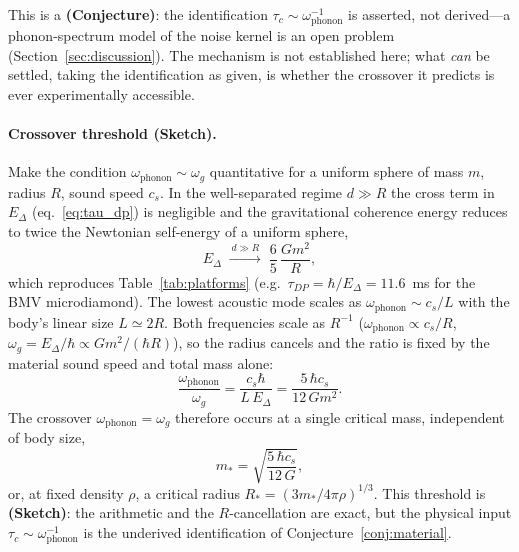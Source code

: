 \documentclass[12pt,a4paper]{article}
\theoremstyle{remark}
\begin{document}
\noindent
This is a \textbf{(Conjecture)}: the identification $\tau_c \sim
\omega_{\text{phonon}}^{-1}$ is asserted, not derived---a phonon-spectrum model of the
noise kernel is an open problem (Section~\ref{sec:discussion}). The mechanism is not
established here; what \emph{can} be settled, taking the identification as given, is
whether the crossover it predicts is ever experimentally accessible.

\paragraph{Crossover threshold (Sketch).} Make the condition
$\omega_{\text{phonon}}\sim\omega_g$ quantitative for a uniform sphere of mass $m$,
radius $R$, sound speed $c_s$. In the well-separated regime $d\gg R$ the cross term in
$E_\Delta$ (eq.~\eqref{eq:tau_dp}) is negligible and the gravitational coherence energy
reduces to twice the Newtonian self-energy of a uniform sphere,
\begin{equation}
E_\Delta \;\xrightarrow{\,d\gg R\,}\; \frac{6}{5}\,\frac{Gm^2}{R},
\label{eq:Edelta_selfenergy}
\end{equation}
which reproduces Table~\ref{tab:platforms} (e.g.\ $\tau_{DP}=\hbar/E_\Delta=11.6$~ms for
the BMV microdiamond). The lowest acoustic mode scales as $\omega_{\text{phonon}}\sim
c_s/L$ with the body's linear size $L\simeq 2R$. Both frequencies scale as $R^{-1}$
($\omega_{\text{phonon}}\propto c_s/R$, $\omega_g=E_\Delta/\hbar\propto Gm^2/(\hbar R)$),
so the radius cancels and the ratio is fixed by the material sound speed and total mass
alone:
\begin{equation}
\frac{\omega_{\text{phonon}}}{\omega_g}
= \frac{c_s\hbar}{L\,E_\Delta}
= \frac{5\,\hbar c_s}{12\,G m^2}.
\label{eq:crossover_ratio}
\end{equation}
The crossover $\omega_{\text{phonon}}=\omega_g$ therefore occurs at a single critical
mass, independent of body size,
\begin{equation}
m_\ast = \sqrt{\frac{5\,\hbar c_s}{12\,G}},
\label{eq:mstar}
\end{equation}
or, at fixed density $\rho$, a critical radius $R_\ast=(3m_\ast/4\pi\rho)^{1/3}$. This
threshold is \textbf{(Sketch)}: the arithmetic and the $R$-cancellation are exact, but the
physical input $\tau_c\sim\omega_{\text{phonon}}^{-1}$ is the underived identification of
Conjecture~\ref{conj:material}.
\end{document}
